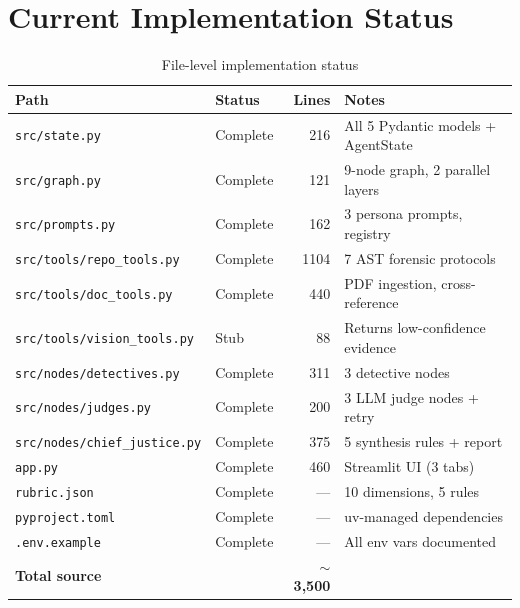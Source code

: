 \documentclass[12pt,a4paper]{article}
\begin{document}
\section{Current Implementation Status}

\begin{table}[h]
\centering
\caption{File-level implementation status}
\begin{tabular}{@{}llrl@{}}
\toprule
\textbf{Path} & \textbf{Status} & \textbf{Lines} & \textbf{Notes} \\
\midrule
\texttt{src/state.py}                  & Complete & 216  & All 5 Pydantic models + AgentState \\
\texttt{src/graph.py}                  & Complete & 121  & 9-node graph, 2 parallel layers \\
\texttt{src/prompts.py}                & Complete & 162  & 3 persona prompts, registry \\
\texttt{src/tools/repo\_tools.py}      & Complete & 1104 & 7 AST forensic protocols \\
\texttt{src/tools/doc\_tools.py}       & Complete & 440  & PDF ingestion, cross-reference \\
\texttt{src/tools/vision\_tools.py}    & Stub     & 88   & Returns low-confidence evidence \\
\texttt{src/nodes/detectives.py}       & Complete & 311  & 3 detective nodes \\
\texttt{src/nodes/judges.py}           & Complete & 200  & 3 LLM judge nodes + retry \\
\texttt{src/nodes/chief\_justice.py}   & Complete & 375  & 5 synthesis rules + report \\
\texttt{app.py}                        & Complete & 460  & Streamlit UI (3 tabs) \\
\texttt{rubric.json}                   & Complete & ---  & 10 dimensions, 5 rules \\
\texttt{pyproject.toml}               & Complete & ---  & uv-managed dependencies \\
\texttt{.env.example}                 & Complete & ---  & All env vars documented \\
\midrule
\textbf{Total source} & & \textbf{$\sim$3,500} & \\
\bottomrule
\end{tabular}
\end{table}


\end{document}
